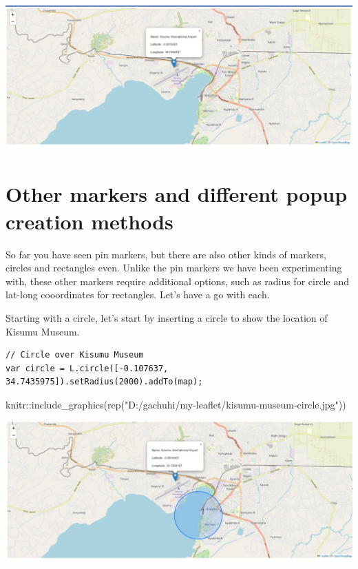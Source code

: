 \documentclass[
]{book}
\newenvironment{Shaded}{\begin{snugshade}}{\end{snugshade}}
\newcommand{\FunctionTok}[1]{\textcolor[rgb]{0.00,0.00,0.00}{#1}}
\newcommand{\NormalTok}[1]{#1}
\newcommand{\SpecialCharTok}[1]{\textcolor[rgb]{0.00,0.00,0.00}{#1}}
\newcommand{\StringTok}[1]{\textcolor[rgb]{0.31,0.60,0.02}{#1}}
\theoremstyle{definition}
\theoremstyle{definition}
\theoremstyle{definition}
\theoremstyle{definition}
\theoremstyle{remark}
\begin{document}
\includegraphics[width=26.6in]{../marker-html}

\hypertarget{other-markers-and-different-popup-creation-methods}{%
\section{Other markers and different popup creation methods}\label{other-markers-and-different-popup-creation-methods}}

So far you have seen pin markers, but there are also other kinds of markers, circles and rectangles even. Unlike the pin markers we have been experimenting with, these other markers require additional options, such as radius for circle and lat-long cooordinates for rectangles. Let's have a go with each.

Starting with a circle, let's start by inserting a circle to show the location of Kisumu Museum.

\begin{verbatim}
// Circle over Kisumu Museum
var circle = L.circle([-0.107637, 34.7435975]).setRadius(2000).addTo(map);
\end{verbatim}

\begin{Shaded}
\begin{Highlighting}[]
\NormalTok{knitr}\SpecialCharTok{::}\FunctionTok{include\_graphics}\NormalTok{(}\FunctionTok{rep}\NormalTok{(}\StringTok{"D:/gachuhi/my{-}leaflet/kisumu{-}museum{-}circle.jpg"}\NormalTok{))}
\end{Highlighting}
\end{Shaded}

\includegraphics[width=26.5in]{../kisumu-museum-circle}
\end{document}
